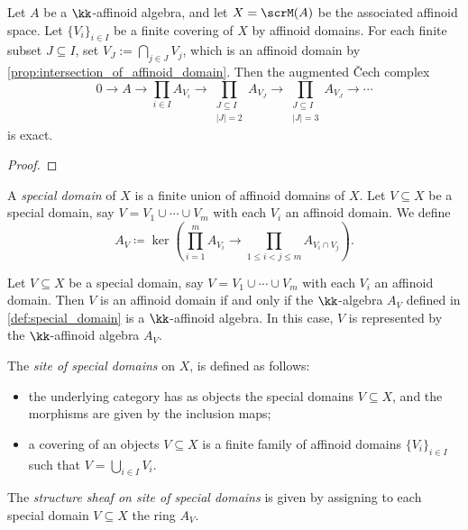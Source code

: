     \begin{theorem}\label{thm:acyclicity_theorem_for_affinoid_domains}
        Let \(A\) be a \(\kk\)-affinoid algebra, and let \(X = \scrM(A)\) be the associated affinoid space.
        Let \(\{V_i\}_{i \in I}\) be a finite covering of \(X\) by affinoid domains.
        For each finite subset \(J \subseteq I\), set \(V_J := \bigcap_{j \in J} V_j\), which is an affinoid domain by \cref{prop:intersection_of_affinoid_domain}.
        Then the augmented Čech complex
        \[
            0 \to A \to \prod_{i \in I} A_{V_i} \to \prod_{\substack{J \subseteq I \\ |J| = 2}} A_{V_J} \to \prod_{\substack{J \subseteq I \\ |J| = 3}} A_{V_J} \to \cdots
        \]
        is exact.
    \end{theorem}
    \begin{proof}
    \end{proof}

    \begin{definition}\label{def:special_domain}
        A \emph{special domain} of \(X\) is a finite union of affinoid domains of \(X\).
        Let \(V \subseteq X\) be a special domain, say \(V = V_1 \cup \cdots \cup V_m\) with each \(V_i\) an affinoid domain.
        We define 
        \[ A_V \coloneqq \ker\left( \prod_{i=1}^m A_{V_i} \to \prod_{1 \le i < j \le m} A_{V_i \cap V_j} \right). \]
    \end{definition}

    \begin{proposition}\label{prop:when_is_special_domain_affinoid_domain}
        Let \(V \subseteq X\) be a special domain, say \(V = V_1 \cup \cdots \cup V_m\) with each \(V_i\) an affinoid domain.
        Then \(V\) is an affinoid domain if and only if the \(\kk\)-algebra \(A_V\) defined in \cref{def:special_domain} is a \(\kk\)-affinoid algebra.
        In this case, \(V\) is represented by the \(\kk\)-affinoid algebra \(A_V\).
    \end{proposition}

    \begin{definition}\label{def:site_of_special_domains_on_affinoid_space}
        The \emph{site of special domains} on \(X\), is defined as follows:
        \begin{itemize}
            \item the underlying category has as objects the special domains \(V \subseteq X\), and the morphisms are given by the inclusion maps;
            \item a covering of an objects \(V \subseteq X\) is a finite family of affinoid domains \(\{V_i\}_{i \in I}\) such that \(V = \bigcup_{i \in I} V_i\).
        \end{itemize}
        The \emph{structure sheaf on site of special domains} is given by assigning to each special domain \(V \subseteq X\) the ring \(A_V\).
    \end{definition}

